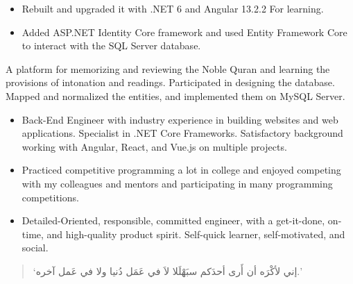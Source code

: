 \documentclass[10pt,a4paper,ragged2e,withhyper]{altacv}
\begin{document}
\begin{paracol}{2}
\divider

\begin{itemize}
\item Rebuilt and upgraded it with .NET 6 and Angular 13.2.2 For learning.
\item Added ASP.NET Identity Core framework and used Entity Framework Core to interact with the SQL Server database.
\end{itemize}

\divider

A platform for memorizing and reviewing the Noble Quran and learning the provisions of intonation and readings. Participated in designing the database. Mapped and normalized the entities, and implemented them on MySQL Server.

\medskip


\switchcolumn


\begin{itemize}
\item Back-End Engineer with industry experience in building websites and web applications. Specialist in .NET Core Frameworks. Satisfactory background working with Angular, React, and Vue.js on multiple projects.
\item Practiced competitive programming a lot in college and enjoyed competing with my colleagues and mentors and participating in many programming competitions.
\item Detailed-Oriented, responsible, committed engineer, with a get-it-done, on-time, and high-quality product spirit. Self-quick learner, self-motivated, and social.
\end{itemize}


\begin{quote}
\begin{RLtext}
`إني لأكْرَه أن أَرى أحدَكم سبَهْلَلا لاَ في عَمَل دُنيا ولا في عَمل آخره.'
\end{RLtext}
\end{quote}




\end{paracol}
\end{document}
